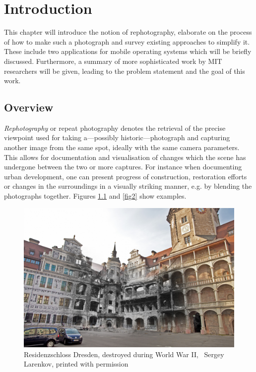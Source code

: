 \chapter{Introduction}

This chapter will introduce the notion of rephotography, elaborate on the
process of how to make such a photograph and survey existing approaches to
simplify it. These include two applications for mobile operating systems which
will be briefly discussed. Furthermore, a summary of more sophisticated work by
MIT researchers will be given, leading to the problem statement and the goal of
this work.

\section{Overview}

\emph{Rephotography} or repeat photography denotes the retrieval of the precise
viewpoint used for taking a---possibly historic---photograph and capturing
another image from the same spot, ideally with the same camera parameters. This
allows for documentation and visualisation of changes which the scene has
undergone between the two or more captures.  For instance when documenting urban
development, one can present progress of construction, restoration efforts or
changes in the surroundings in a visually striking manner, e.g. by blending the
photographs together.  Figures \ref{fig1} and \ref{fig2} show examples.

\begin{figure}
   \includegraphics[width=\textwidth]{gfx/1945_2014_Residenzschloss_small.jpg}
   \caption{Residenzschloss Dresden, destroyed during World War II,
   \textcopyright\ Sergey Larenkov, printed with permission}
   \label{fig1}
\end{figure}

